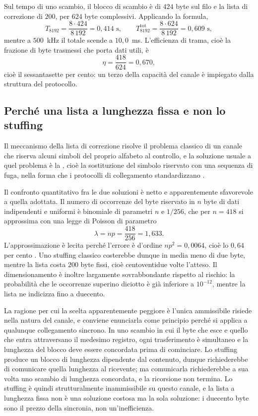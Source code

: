 Sul tempo di uno scambio, il blocco di scambio è di $424$ byte sul filo e la lista di correzione di $200$, per $624$ byte complessivi. Applicando la formula,
\[
T_{8192} = \frac{8 \cdot 424}{8\,192} = 0{,}414 \text{ s}, \qquad
T_{8192}^{\text{tot}} = \frac{8 \cdot 624}{8\,192} = 0{,}609 \text{ s},
\]
mentre a $500$~kHz il totale scende a $10{,}0$~ms. L'efficienza di trama, cioè la frazione di byte trasmessi che porta dati utili, è
\[
\eta = \frac{418}{624} = 0{,}670,
\]
cioè il sessantasette per cento: un terzo della capacità del canale è impiegato dalla struttura del protocollo.

\subsection{Perché una lista a lunghezza fissa e non lo stuffing}

Il meccanismo della lista di correzione risolve il problema classico di un canale che riserva alcuni simboli del proprio alfabeto al controllo, e la soluzione usuale a quel problema è la , cioè la sostituzione del simbolo riservato con una sequenza di fuga, nella forma che i protocolli di collegamento standardizzano \cite{rfc1662,tanenbaum}.

Il confronto quantitativo fra le due soluzioni è netto e apparentemente sfavorevole a quella adottata. Il numero di occorrenze del byte riservato in $n$ byte di dati indipendenti e uniformi è binomiale di parametri $n$ e $1/256$, che per $n = 418$ si approssima con una legge di Poisson di parametro
\[
\lambda = n p = \frac{418}{256} = 1{,}633.
\]
L'approssimazione è lecita perché l'errore è d'ordine $np^2 = 0{,}0064$, cioè lo $0{,}64$ per cento \cite{feller}. Uno stuffing classico costerebbe dunque in media meno di due byte, mentre la lista costa $200$ byte fissi, cioè centoventidue volte l'atteso. Il dimensionamento è inoltre largamente sovrabbondante rispetto al rischio: la probabilità che le occorrenze superino diciotto è già inferiore a $10^{-12}$, mentre la lista ne indicizza fino a duecento.

La ragione per cui la scelta apparentemente peggiore è l'unica ammissibile risiede nella natura del canale, e conviene enunciarla come principio perché si applica a qualunque collegamento sincrono. In uno scambio in cui il byte che esce e quello che entra attraversano il medesimo registro, ogni trasferimento è simultaneo e la lunghezza del blocco deve essere concordata prima di cominciare. Lo stuffing produce un blocco di lunghezza dipendente dal contenuto, dunque richiederebbe di comunicare quella lunghezza al ricevente; ma comunicarla richiederebbe a sua volta uno scambio di lunghezza concordata, e la ricorsione non termina. Lo stuffing è quindi strutturalmente inammissibile su questo canale, e la lista a lunghezza fissa non è una soluzione costosa ma la sola soluzione: i duecento byte sono il prezzo della sincronia, non un'inefficienza.

